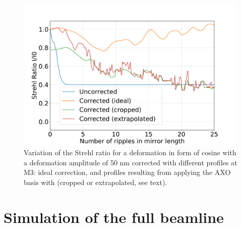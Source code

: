 \documentclass{iucr}
\newcommand{\inblue}[1]{{\color{black}#1}}
\begin{document}
  \begin{figure}
  \label{fig:strehlRatioCosine} 
  \includegraphics[width=0.99\textwidth]{figures/scan_peak_vs_cos50.pdf}
  \caption{Variation of the Strehl ratio for a deformation in form of cosine with a deformation amplitude of 50 nm \inblue{corrected with different profiles at M3: ideal correction, and profiles resulting from applying the AXO basis with (cropped or extrapolated, see text).}}
  \end{figure} 

%
%
%
\section{Simulation of the full beamline}
\label{sec:2D}
\end{document}
